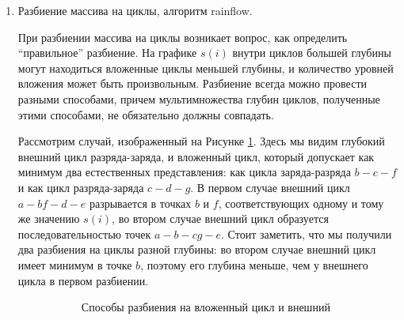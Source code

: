 \documentclass{report}
\begin{document}
\begin{enumerate}
\item Разбиение массива на циклы, алгоритм rainflow.

При разбиении массива на циклы возникает вопрос, как определить ``правильное'' разбиение.
На графике $s(i)$ внутри циклов большей глубины могут находиться вложенные циклы меньшей глубины, и количество уровней вложения может быть произвольным.
Разбиение всегда можно провести разными способами, причем мультимножества глубин циклов, полученные этими способами, не обязательно должны совпадать.

Рассмотрим случай, изображенный на Рисунке \ref{fig:nested-cycle}.
Здесь мы видим глубокий внешний цикл разряда-заряда, и вложенный цикл, который допускает как минимум два естественных представления: как цикла заряда-разряда $b-c-f$ и как цикл разряда-заряда $c-d-g$.
В первом случае внешний цикл $a-bf-d-e$ разрывается в точках $b$ и $f$, соответствующих одному и тому же значению $s(i)$, во втором случае внешний цикл образуется последовательностью точек $a-b-cg-e$.
Стоит заметить, что мы получили два разбиения на циклы разной глубины: во втором случае внешний цикл имеет минимум в точке $b$, поэтому его глубина меньше, чем у внешнего цикла в первом разбиении.


\begin{figure}[]
\centering
\begin{subfigure}[b]{0.45\textwidth}
\centering
{}
\caption{Способы разбиения на вложенный цикл и внешний}
\label{fig:nested-cycle}
\end{subfigure}
\hfill
\begin{subfigure}[b]{0.45\textwidth}
\centering
{}
\end{subfigure}
\end{figure}
\end{enumerate}
\end{document}
